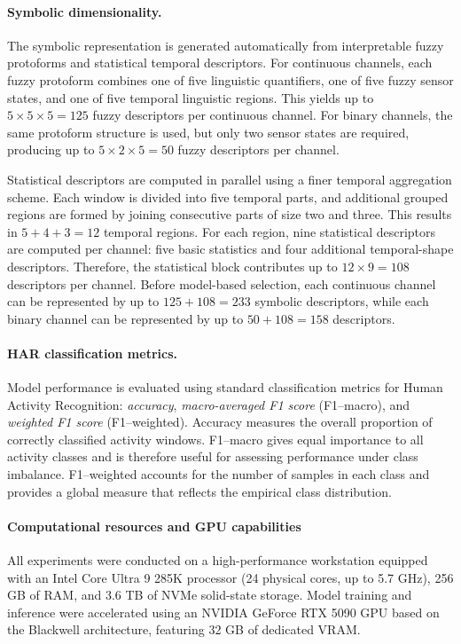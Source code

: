 \documentclass[preprint,12pt]{elsarticle}
\begin{document}
\paragraph{Symbolic dimensionality.}
The symbolic representation is generated automatically from interpretable fuzzy protoforms and statistical temporal descriptors. For continuous channels, each fuzzy protoform combines one of five linguistic quantifiers, one of five fuzzy sensor states, and one of five temporal linguistic regions. This yields up to $5 \times 5 \times 5 = 125$ fuzzy descriptors per continuous channel. For binary channels, the same protoform structure is used, but only two sensor states are required, producing up to $5 \times 2 \times 5 = 50$ fuzzy descriptors per channel.

Statistical descriptors are computed in parallel using a finer temporal aggregation scheme. Each window is divided into five temporal parts, and additional grouped regions are formed by joining consecutive parts of size two and three. This results in $5 + 4 + 3 = 12$ temporal regions. For each region, nine statistical descriptors are computed per channel: five basic statistics and four additional temporal-shape descriptors. Therefore, the statistical block contributes up to $12 \times 9 = 108$ descriptors per channel. Before model-based selection, each continuous channel can be represented by up to $125 + 108 = 233$ symbolic descriptors, while each binary channel can be represented by up to $50 + 108 = 158$ descriptors.

\paragraph{HAR classification metrics.}
Model performance is evaluated using standard classification metrics for Human Activity Recognition: \emph{accuracy}, \emph{macro-averaged F1 score} (F1--macro), and \emph{weighted F1 score} (F1--weighted). Accuracy measures the overall proportion of correctly classified activity windows. F1--macro gives equal importance to all activity classes and is therefore useful for assessing performance under class imbalance. F1--weighted accounts for the number of samples in each class and provides a global measure that reflects the empirical class distribution.

\paragraph{Computational resources and GPU capabilities}
All experiments were conducted on a high-performance workstation equipped with an Intel Core Ultra 9 285K processor (24 physical cores, up to 5.7 GHz), 256 GB of RAM, and 3.6 TB of NVMe solid-state storage. Model training and inference were accelerated using an NVIDIA GeForce RTX 5090 GPU based on the Blackwell architecture, featuring 32 GB of dedicated VRAM.
\end{document}
